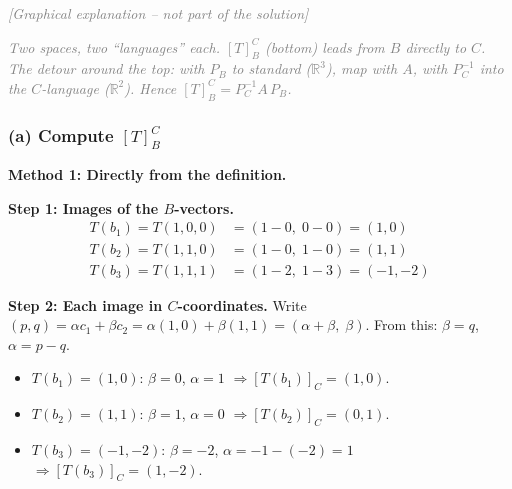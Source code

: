\documentclass[a4paper,12pt]{article}
\newcommand{\grafik}{\textcolor{gray}{\small\textit{[Graphical explanation -- not part of the solution]}}}
\begin{document}
\grafik

\begin{center}
\end{center}

\textcolor{gray}{\small\textit{Two spaces, two ``languages'' each. $[T]_B^C$ (bottom) leads from $B$ directly to $C$. The detour around the top: with $P_B$ to standard ($\mathbb{R}^3$), map with $A$, with $P_C^{-1}$ into the $C$-language ($\mathbb{R}^2$). Hence $[T]_B^C = P_C^{-1} A\, P_B$.}}

\subsubsection*{(a) Compute $[T]_B^C$}

\textbf{Method 1: Directly from the definition.}

\textbf{Step 1: Images of the $B$-vectors.}
\begin{align*}
T(b_1) = T(1,0,0) &= (1 - 0,\; 0 - 0) = (1, 0) \\
T(b_2) = T(1,1,0) &= (1 - 0,\; 1 - 0) = (1, 1) \\
T(b_3) = T(1,1,1) &= (1 - 2,\; 1 - 3) = (-1, -2)
\end{align*}

\textbf{Step 2: Each image in $C$-coordinates.} Write $(p, q) = \alpha c_1 + \beta c_2 = \alpha(1,0) + \beta(1,1) = (\alpha + \beta,\; \beta)$. From this: $\beta = q$, $\alpha = p - q$.

\begin{itemize}[leftmargin=*, nosep]
    \item $T(b_1) = (1,0)$: $\beta = 0$, $\alpha = 1$ \; $\Rightarrow [T(b_1)]_C = (1, 0)$.
    \item $T(b_2) = (1,1)$: $\beta = 1$, $\alpha = 0$ \; $\Rightarrow [T(b_2)]_C = (0, 1)$.
    \item $T(b_3) = (-1,-2)$: $\beta = -2$, $\alpha = -1-(-2) = 1$ \; $\Rightarrow [T(b_3)]_C = (1, -2)$.
\end{itemize}
\end{document}
